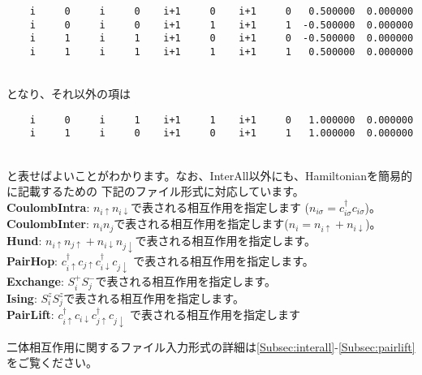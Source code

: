 \begin{description}
\begin{minipage}{16cm}
\begin{screen}
\begin{verbatim}
    i     0     i     0    i+1     0    i+1     0   0.500000  0.000000
    i     0     i     0    i+1     1    i+1     1  -0.500000  0.000000
    i     1     i     1    i+1     0    i+1     0  -0.500000  0.000000
    i     1     i     1    i+1     1    i+1     1   0.500000  0.000000
\end{verbatim}
\end{screen}
\end{minipage}
~\\
となり、それ以外の項は\\
\begin{minipage}{16cm}
\begin{screen}
\begin{verbatim}
    i     0     i     1    i+1     1    i+1     0   1.000000  0.000000
    i     1     i     0    i+1     0    i+1     1   1.000000  0.000000
\end{verbatim}
\end{screen}
\end{minipage}
~\\
と表せばよいことがわかります。なお、InterAll以外にも、Hamiltonianを簡易的に記載するための
下記のファイル形式に対応しています。
~\\{\bf CoulombIntra}: $n_ {i \uparrow}n_{i \downarrow}$で表される相互作用を指定します
($n_{i \sigma}=c_{i\sigma}^{\dag}c_{i\sigma}$)。
~\\{\bf CoulombInter}: $n_ {i}n_{j}$で表される相互作用を指定します($n_i=n_{i\uparrow}+n_{i\downarrow}$)。
~\\{\bf Hund}: $n_{i\uparrow}n_{j\uparrow}+n_{i\downarrow}n_{j\downarrow}$で表される相互作用を指定します。
~\\{\bf PairHop}:  $c_ {i \uparrow}^{\dag}c_{j\uparrow}c_{i \downarrow}^{\dag}c_{j  \downarrow}$
で表される相互作用を指定します。
~\\{\bf Exchange}: $S_i^+ S_j^-$で表される相互作用を指定します。
~\\{\bf Ising}: $S_i^z S_j^z$で表される相互作用を指定します。
~\\{\bf PairLift}: $c_ {i \uparrow}^{\dag}c_{i\downarrow}c_{j \uparrow}^{\dag}c_{j \downarrow}$
で表される相互作用を指定します

二体相互作用に関するファイル入力形式の詳細は\ref{Subsec:interall}-\ref{Subsec:pairlift}をご覧ください。

\end{description}

